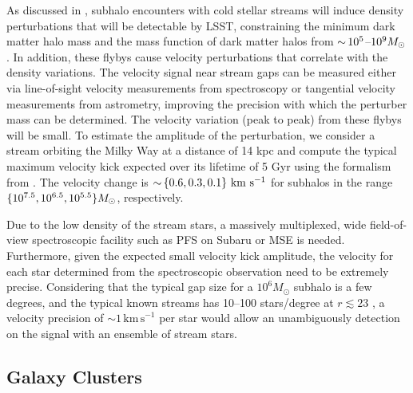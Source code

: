 As discussed in , subhalo encounters with cold stellar streams will induce density perturbations that will be detectable by LSST, constraining the minimum dark matter halo mass and the mass function of dark matter halos from $ {\sim}\,10^5$--$10^9 M_\odot$. In addition, these flybys cause velocity perturbations that correlate with the density variations.  The velocity signal near stream gaps can be measured either via line-of-sight velocity measurements from spectroscopy or tangential velocity measurements from astrometry, improving the precision with which the perturber mass can be determined.
The velocity variation (peak to peak) from these flybys will be small. To estimate the amplitude of the perturbation, we consider a stream orbiting the Milky Way at a distance of 14 kpc and compute the typical maximum velocity kick expected over its lifetime of 5 Gyr using the formalism from \citet{erkal2016}.  The velocity change is $ {\sim}\, \{0.6, 0.3, 0.1\} \mathrm{\,\mathrm{\,km}\,\mathrm{\,s}^{-1}}$ for subhalos in the range $\{ 10^{7.5}, 10^{6.5}, 10^{5.5} \} M_\odot$, respectively. %

Due to the low density of the stream stars, a massively multiplexed, wide field-of-view spectroscopic facility such as PFS on Subaru or MSE is needed. 
Furthermore, given the expected small velocity kick amplitude, the velocity for each star determined from the spectroscopic observation need to be extremely precise.
Considering that the typical gap size for a $10^6 M_\odot$ subhalo is a few degrees, and the typical known streams has 10--100 stars/degree at $r\lesssim23$ \citep[\eg,][]{erkal2017, DeBoer:2018}, a velocity precision of $\sim1\,\mathrm{km\,s}^{-1}$ per star would allow an unambiguously detection on the signal with an ensemble of stream stars.  


\subsection{Galaxy Clusters }


